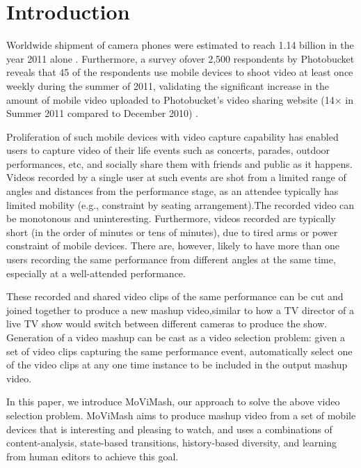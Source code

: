 \documentclass{sig-alternate}
\begin{document}



\section{Introduction}
Worldwide shipment of camera phones were estimated to reach
1.14 billion in the year 2011 alone \cite{1}. Furthermore, a survey ofover 2,500 respondents by Photobucket reveals that 45 of the respondents use mobile devices to shoot video at least once weekly during the summer of 2011, validating the significant increase in the amount of mobile video uploaded to Photobucket’s video sharing website (14× in Summer 2011 compared to December 2010) \cite{2}.

Proliferation of such mobile devices with video capture capability has enabled users to capture video of their life events such as concerts, parades, outdoor performances, etc, and socially share them with friends and public as it happens. Videos recorded by a single user at such events are shot from a limited range of angles and distances from the performance stage, as an attendee typically has limited mobility (e.g., constraint by seating arrangement).The recorded video can be monotonous and uninteresting. Furthermore, videos recorded are typically short (in the order of minutes or tens of minutes), due to tired arms or power constraint of mobile devices. There are, however, likely to have more than one users recording the same performance from different angles at the same time, especially at a well-attended performance.

These recorded and shared video clips of the same performance can be cut and joined together to produce a new mashup video,similar to how a TV director of a live TV show would switch between different cameras to produce the show. Generation of a video mashup can be cast as a video selection problem: given a set of video clips capturing the same performance event, automatically select one of the video clips at any one time instance to be included in the output mashup video.

In this paper, we introduce MoViMash, our approach to solve the above video selection problem. MoViMash aims to produce mashup video from a set of mobile devices that is interesting and pleasing to watch, and uses a combinations of content-analysis, state-based transitions, history-based diversity, and learning from human editors to achieve this goal.
\end{document}
